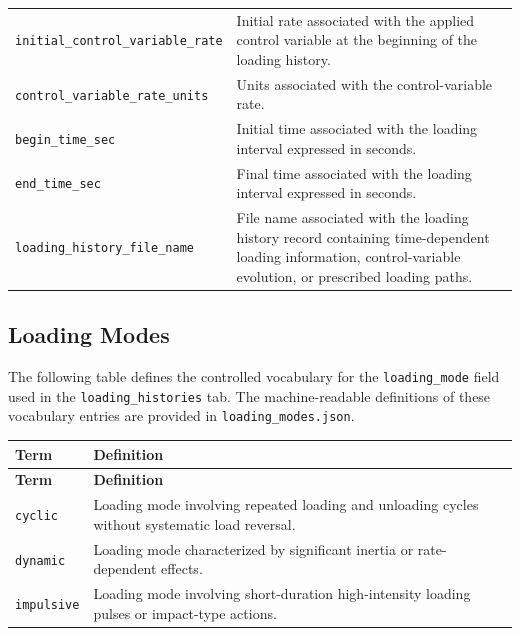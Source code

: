\documentclass[11pt]{book}
\begin{document}
{\begin{longtable}{p{}p{}}
\texttt{initial\_control\_variable\_rate} &
Initial rate associated with the applied control variable at the beginning of the loading history. \\

\texttt{control\_variable\_rate\_units} &
Units associated with the control-variable rate. \\

\texttt{begin\_time\_sec} &
Initial time associated with the loading interval expressed in seconds. \\

\texttt{end\_time\_sec} &
Final time associated with the loading interval expressed in seconds. \\

\texttt{loading\_history\_file\_name} &
File name associated with the loading history record containing time-dependent loading information, control-variable evolution, or prescribed loading paths. \\

\hline
\end{longtable}


\subsection{Loading Modes}
\label{vocab:loading_modes_list}

The following table defines the controlled vocabulary for the \texttt{loading\_mode} field used in the \texttt{loading\_histories} tab. The machine-readable definitions of these vocabulary entries are provided in \texttt{loading\_modes.json}.

\begin{longtable}{p{}p{}}
\hline
\textbf{Term} & \textbf{Definition} \\
\hline
\endfirsthead

\hline
\textbf{Term} & \textbf{Definition} \\
\hline
\endhead

\texttt{cyclic} &
Loading mode involving repeated loading and unloading cycles without systematic load reversal. \\

\texttt{dynamic} &
Loading mode characterized by significant inertia or rate-dependent effects. \\

\texttt{impulsive} &
Loading mode involving short-duration high-intensity loading pulses or impact-type actions. \\


\end{longtable}}
\end{document}
